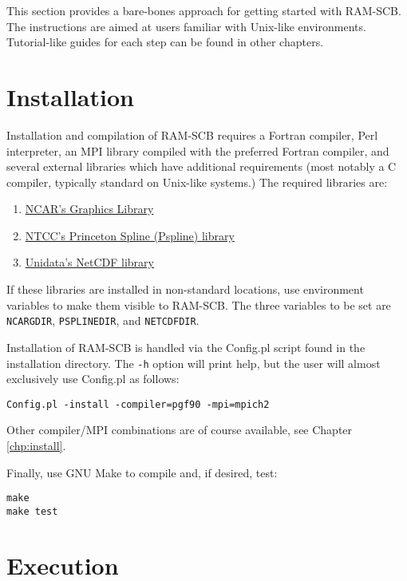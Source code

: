 This section provides a bare-bones approach for getting started with RAM-SCB. 
The instructions are aimed at users familiar with Unix-like environments.
Tutorial-like guides for each step can be found in other chapters.

\section{Installation}

Installation and compilation of RAM-SCB requires a Fortran compiler, 
Perl interpreter, an MPI library compiled with the preferred Fortran compiler, 
and several external libraries which have 
additional 
requirements (most notably a C compiler, typically standard on Unix-like 
systems.)  The required libraries are:

\begin{enumerate}
\item{\href{http://www.ncl.ucar.edu/Download/}{NCAR's Graphics Library}}

\item{\href{http://w3.pppl.gov/rib/repositories/NTCC/files/pspline.tar.gz}{NTCC's Princeton Spline (Pspline) library}}

\item{\href{http://www.unidata.ucar.edu/downloads/netcdf/ftp/netcdf-4.0.1.tar.gz}{Unidata's NetCDF library}}
\end{enumerate}

If these libraries are installed in non-standard locations, use environment
variables to make them visible to RAM-SCB.  The three variables to be set are
{\tt NCARGDIR}, {\tt PSPLINEDIR}, and {\tt NETCDFDIR}.

Installation of RAM-SCB is handled via the Config.pl script found in the
installation directory.  The {\tt -h} option will print help, but the user 
will almost exclusively use Config.pl as follows:

\begin{verbatim}
Config.pl -install -compiler=pgf90 -mpi=mpich2
\end{verbatim}

Other compiler/MPI combinations are of course available, see Chapter 
\ref{chp:install}.

Finally, use GNU Make to compile and, if desired, test:

\begin{verbatim}
make
make test
\end{verbatim}

\section{Execution}


